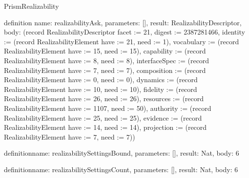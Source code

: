 \begin{lexlean}{PrismRealizability}
\begin{semanticmodule}
definition{
  name: realizabilityAsk,
  parameters: [],
  result: RealizabilityDescriptor,
  body: (record RealizabilityDescriptor {facet := 21, digest := 2387281466, identity := (record RealizabilityElement {have := 21, need := 1}), vocabulary := (record RealizabilityElement {have := 15, need := 15}), capability := (record RealizabilityElement {have := 8, need := 8}), interfaceSpec := (record RealizabilityElement {have := 7, need := 7}), composition := (record RealizabilityElement {have := 0, need := 0}), dynamics := (record RealizabilityElement {have := 10, need := 10}), fidelity := (record RealizabilityElement {have := 26, need := 26}), resources := (record RealizabilityElement {have := 1107, need := 50}), authority := (record RealizabilityElement {have := 25, need := 25}), evidence := (record RealizabilityElement {have := 14, need := 14}), projection := (record RealizabilityElement {have := 7, need := 7})})
}

definition{name: realizabilitySettingsBound, parameters: [], result: Nat, body: 6}

definition{name: realizabilitySettingsCount, parameters: [], result: Nat, body: 6}
\end{semanticmodule}
\end{lexlean}
